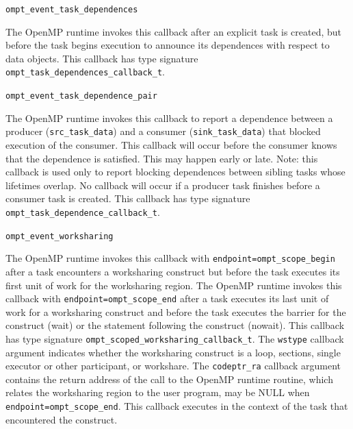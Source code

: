 \documentclass{article}
\newcommand{\descheader}[1]{{\needspace{3\baselineskip}\vspace{1em}\noindent \fbox{#1}}}
\begin{document}
\begin{description}
\sloppy


\item \verb|ompt_event_task_dependences|

  The OpenMP runtime invokes this callback after an explicit task is created, 
  but before the task begins execution to announce its dependences with respect to data objects. 
  This callback has type signature \verb|ompt_task_dependences_callback_t|.
  
\item \verb|ompt_event_task_dependence_pair|

The OpenMP runtime invokes this callback to report a dependence between a producer (\verb|src_task_data|) 
and a consumer (\verb|sink_task_data|) that blocked execution of the consumer.
This callback will occur before the consumer knows that the dependence is satisfied. This may happen early or late.
Note: this callback is used only to report blocking dependences between sibling tasks whose lifetimes overlap. 
No callback will occur if a producer task finishes before a consumer task is created.
This callback has type signature \verb|ompt_task_dependence_callback_t|. 
\end{description}


\descheader{Worksharing}

\begin{description}

\item \verb|ompt_event_worksharing|

\sloppy
The OpenMP runtime invokes this callback with \verb|endpoint=ompt_scope_begin| after a task encounters a worksharing 
construct but before the task executes its first unit of work for the worksharing region. 
The OpenMP runtime invokes this callback with \verb|endpoint=ompt_scope_end| after a task executes 
its last unit of work for a worksharing construct and before the task executes the barrier  for the construct (wait) or the statement following the construct (nowait).
This callback has type signature \verb|ompt_scoped_worksharing_callback_t|.
The \verb|wstype| callback argument indicates whether the worksharing construct is a loop, sections, single executor or other participant, 
or workshare.
The \verb|codeptr_ra| callback argument contains the return address of the call to the OpenMP runtime routine, which relates the worksharing region to the user program,
may be NULL when \verb|endpoint=|\verb|ompt_scope_end|.
This callback executes in the context of the task that encountered the construct. 

\end{description}
\end{document}
